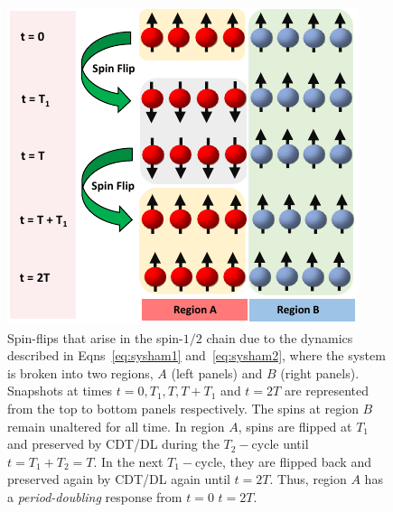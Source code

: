 \documentclass[%
nofootinbib,
reprint,
superscriptaddress,
amsmath,amssymb,showkeys,
aps,
prb,
]{revtex4-2}
\begin{document}
	\begin{figure}[t!]
		\centering
		\includegraphics[width=7.cm]{pic_regions.pdf}
		\caption{Spin-flips that arise in the spin-$1/2$ chain due to the dynamics described in Eqns~\ref{eq:sysham1} and~\ref{eq:sysham2}, where the system is broken into two regions, $A$ (left panels) and $B$ (right panels). Snapshots at times $t=0, T_1, T, T+T_1 $ and $t=2T$ are represented from the top to bottom panels respectively. The spins at region $B$ remain unaltered for all time. In region $A$, spins are flipped at $T_1$ and preserved by CDT/DL during the $T_2-$cycle until $t=T_1+T_2=T$. In the next $T_1-$cycle, they are flipped back and preserved again by CDT/DL again until $t=2T$. Thus, region $A$ has a \textit{period-doubling} response from $t=0$ $t=2T$.}
		\label{Fig:spinflip}
	\end{figure}
\end{document}
